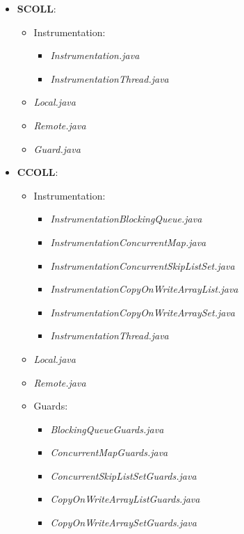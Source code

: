 \documentclass[]{usiinfthesis}
\begin{document}
\small
\begin{itemize}
    \item \textbf{SCOLL}:
    \begin{itemize}
        \item Instrumentation:
        \begin{itemize}
            \item \textit{Instrumentation.java}
            \item \textit{InstrumentationThread.java}
        \end{itemize}
        \item \textit{Local.java}
        \item \textit{Remote.java}
        \item \textit{Guard.java}
    \end{itemize}
    \item \textbf{CCOLL}:
    \begin{itemize}
        \item Instrumentation:
        \begin{itemize}
            \item \textit{InstrumentationBlockingQueue.java}
            \item \textit{InstrumentationConcurrentMap.java}
            \item \textit{InstrumentationConcurrentSkipListSet.java}
            \item \textit{InstrumentationCopyOnWriteArrayList.java}
            \item \textit{InstrumentationCopyOnWriteArraySet.java}
            \item \textit{InstrumentationThread.java}
        \end{itemize}
        \item \textit{Local.java}
        \item \textit{Remote.java}
        \item Guards:
        \begin{itemize}
            \item \textit{BlockingQueueGuards.java}
            \item \textit{ConcurrentMapGuards.java}
            \item \textit{ConcurrentSkipListSetGuards.java}
            \item \textit{CopyOnWriteArrayListGuards.java}
            \item \textit{CopyOnWriteArraySetGuards.java}
        \end{itemize}

\end{itemize}
\end{itemize}
\end{document}

